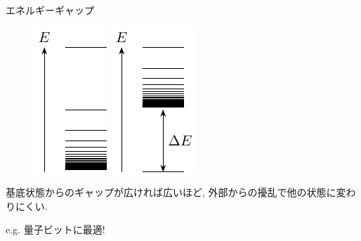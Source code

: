 \documentclass[dvipdfm]{beamer}
\begin{document}
\begin{frame}{エネルギーギャップ}
    \begin{figure}
        \centering
        \begin{minipage}{0.45\linewidth}
            \includegraphics[width=0.3\linewidth]{gapless.pdf}
        \end{minipage}
        \begin{minipage}{0.45\linewidth}
            \includegraphics[width=0.3\linewidth]{gapped.pdf}
        \end{minipage}
    \end{figure}
    基底状態からのギャップが広ければ広いほど, 外部からの擾乱で他の状態に変わりにくい. 

    e.g. 量子ビットに最適!
\end{frame}
\end{document}
